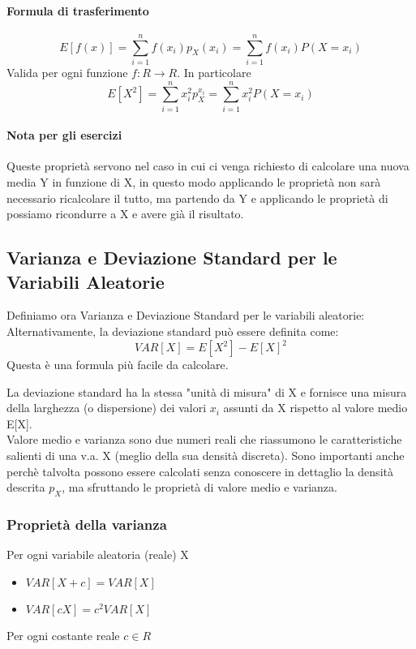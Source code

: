 	\paragraph{Formula di trasferimento}
	\begin{equation}
		E[f(x)] = \sum_{i = 1}^{n} f(x_i)p_X(x_i)
		= \sum_{i = 1}^{n}f(x_i)P(X = x_i)
	\end{equation}
	Valida per ogni funzione $f:R \to R$. In particolare
	\begin{equation}
		E[X^2] = \sum_{i = 1}^{n} x_i^2 p_X^{x_i} = \sum_{i = 1}^{n} x_i^2P(X=x_i)
	\end{equation}

	\paragraph*{Nota per gli esercizi} Queste proprietà servono nel caso in cui ci venga
	richiesto di calcolare una nuova media Y in funzione di X, in questo modo applicando
	le proprietà non sarà necessario ricalcolare il tutto, ma partendo da Y e applicando
	le proprietà di possiamo ricondurre a X e avere già il risultato.

	\subsection[Varianza e Deviazione Standard]{Varianza e Deviazione Standard per le Variabili Aleatorie}
	Definiamo ora Varianza e Deviazione Standard per le variabili aleatorie:
	Alternativamente, la deviazione standard può essere definita come:
	\[ VAR[X] = E[X^2] - E[X]^2 \]
	Questa è una formula più facile da calcolare.

	La deviazione standard ha la stessa "unità di misura" di X e fornisce
	una misura della larghezza (o dispersione) dei valori $x_i$ assunti da X rispetto
	al valore medio E[X].
	\\Valore medio e varianza sono due numeri reali che riassumono
	le caratteristiche salienti di una v.a. X (meglio della sua densità discreta).
	Sono importanti anche perchè talvolta possono essere calcolati
	senza conoscere in dettaglio la densità descrita $p_X$, ma sfruttando le
	proprietà di valore medio e varianza.

	\subsubsection{Proprietà della varianza}
	Per ogni variabile aleatoria (reale) X
	\begin{itemize}
		\item $VAR[X+c] = VAR[X]$
		\item $VAR[cX] = c^2 VAR[X]$
	\end{itemize}
	Per ogni costante reale $c \in R$
